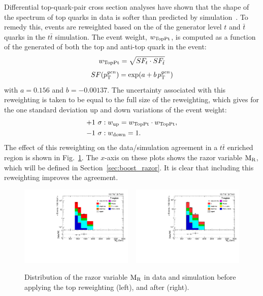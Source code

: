 Differential top-quark-pair cross section analyses have shown that the shape of the \pt spectrum of 
top quarks in data is softer than predicted by simulation~\cite{toppt,toppt_twiki}. 
To remedy this, events are reweighted based on the \pt of the generator level $t$ and $\bar{t}$
quarks in the $t\bar{t}$ simulation.
The event weight, $w_{\rm TopPt}$, is computed as a function of the generated \pt of both the top
and anti-top quark in the event: 
\begin{equation}
w_{\rm TopPt} = \sqrt{ SF_t \cdot SF_{\bar{t}} }
\end{equation}
\begin{equation}
SF(p_{\mathrm{T}}^{gen}) = \exp(a + b\, p_{\mathrm{T}}^{gen})
\end{equation}
with $a = 0.156$ and $b = -0.00137$.
The uncertainty associated with this reweighting is taken to be equal to the full size of the
reweighting, which gives for the one standard deviation up and down variations of the event
weight:
\begin{align}
 +1~\sigma &: w_{\rm up} = w_{\textrm{TopPt}} \cdot w_{\textrm{TopPt}}, \\
 -1~\sigma &: w_{\rm down} = 1 .
\end{align}
The effect of this reweighting on the data/simulation agreement in a $t\bar{t}$ enriched region is
shown in Fig.~\ref{fig:TopPt}. The $x$-axis on these plots shows the razor variable $\mathrm{M_R}$, which
will be defined in Section~\ref{sec:boost_razor}. It is clear that including this reweighting
improves the agreement. 

 
\begin{figure}[htpb]
\centering
\includegraphics[width=0.48\textwidth]
{figures/razor_selection/plots_noTopPt/DataMC_MR_g1Mbg1W1LlmT100_mdPhig0p5_width}
~
\includegraphics[width=0.48\textwidth]
{figures/razor_selection/plots/DataMC_MR_g1Mbg1W1LlmT100_mdPhig0p5_width}
\caption{Distribution of the razor variable $\mathrm{M_R}$ in data and simulation before applying the top
\pt reweighting (left), and after (right). 
\label{fig:TopPt}}
\end{figure}



